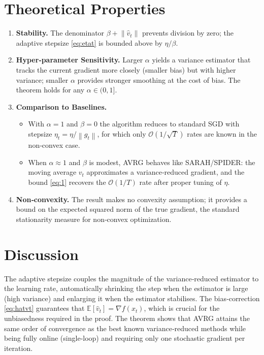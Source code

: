 \documentclass{article}
\newcommand{\E}{\mathbb{E}}
\newcommand{\norm}[1]{\left\lVert#1\right\rVert}
\begin{document}
\section*{Theoretical Properties}
\begin{enumerate}[label=\arabic*)]
\item \textbf{Stability.} The denominator $\beta+\norm{\hat v_t}$ prevents division by zero; the adaptive stepsize \eqref{eq:etat} is bounded above by $\eta/\beta$.
\item \textbf{Hyper‑parameter Sensitivity.} Larger $\alpha$ yields a variance estimator that tracks the current gradient more closely (smaller bias) but with higher variance; smaller $\alpha$ provides stronger smoothing at the cost of bias. The theorem holds for any $\alpha\in(0,1]$.
\item \textbf{Comparison to Baselines.}
    \begin{itemize}
        \item With $\alpha=1$ and $\beta=0$ the algorithm reduces to standard SGD with stepsize $\eta_t=\eta/\norm{g_t}$, for which only $\mathcal{O}(1/\sqrt{T})$ rates are known in the non‑convex case.
        \item When $\alpha\approx 1$ and $\beta$ is modest, AVRG behaves like SARAH/SPIDER: the moving average $v_t$ approximates a variance‑reduced gradient, and the bound \eqref{eq:1} recovers the $\mathcal{O}(1/T)$ rate after proper tuning of $\eta$.
    \end{itemize}
\item \textbf{Non‑convexity.} The result makes no convexity assumption; it provides a bound on the expected squared norm of the true gradient, the standard stationarity measure for non‑convex optimization.
\end{enumerate}

\section*{Discussion}
The adaptive stepsize couples the magnitude of the variance‑reduced estimator to the learning rate, automatically shrinking the step when the estimator is large (high variance) and enlarging it when the estimator stabilises. The bias‑correction \eqref{eq:hatvt} guarantees that $\E[\hat v_t]=\nabla f(x_t)$, which is crucial for the unbiasedness required in the proof. The theorem shows that AVRG attains the same order of convergence as the best known variance‑reduced methods while being fully online (single‑loop) and requiring only one stochastic gradient per iteration.
\end{document}
